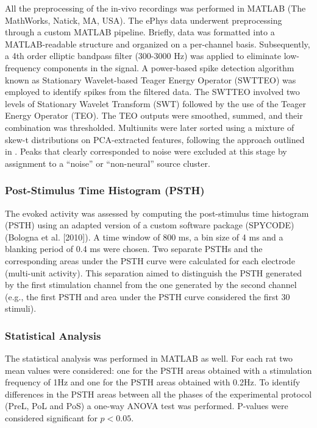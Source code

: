 All the preprocessing of the in-vivo recordings was performed in MATLAB (The MathWorks, Natick, MA, USA). The ePhys data underwent preprocessing through a custom MATLAB pipeline. Briefly, data was formatted into a MATLAB-readable structure and organized on a per-channel basis. Subsequently, a 4th order elliptic bandpass filter (300-3000 Hz) was applied to eliminate low-frequency components in the signal. A power-based spike detection algorithm known as Stationary Wavelet-based Teager Energy Operator (SWTTEO) \cite{Lieb2017} was employed to identify spikes from the filtered data. The SWTTEO involved two levels of Stationary Wavelet Transform (SWT) followed by the use of the Teager Energy Operator (TEO). The TEO outputs were smoothed, summed, and their combination was thresholded. Multiunits were later sorted using a mixture of skew-t distributions on PCA-extracted features, following the approach outlined in \cite{Toosi2021}. Peaks that clearly corresponded to noise were excluded at this stage by assignment to a “noise” or “non-neural” source cluster.

\subsubsection{Post-Stimulus Time Histogram (PSTH)}

The evoked activity was assessed by computing the post-stimulus time histogram (PSTH) using an adapted version of a custom software package (SPYCODE) (Bologna et al. [2010]). A time window of 800 ms, a bin size of 4 ms and a blanking period of 0.4 ms were chosen. Two separate PSTHs and the corresponding areas under the PSTH curve were calculated for each electrode (multi-unit activity). This separation aimed to distinguish the PSTH generated by the first stimulation channel from the one generated by the second channel (e.g., the first PSTH and area under the PSTH curve considered the first 30 stimuli).

\subsubsection{Statistical Analysis}

The statistical analysis was performed in MATLAB as well. For each rat two mean values were considered: one for the PSTH areas obtained with a stimulation frequency of 1Hz and one for the PSTH areas obtained with 0.2Hz. To identify differences in the PSTH areas between all the phases of the experimental protocol (PreL, PoL and PoS) a one-way ANOVA test was performed. P-values were considered significant for $p<0.05$.

